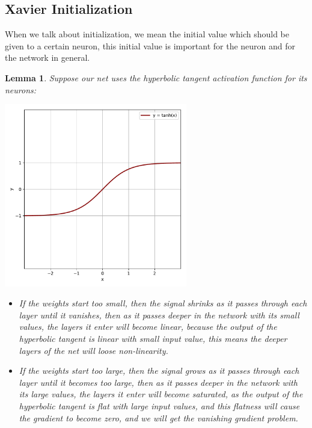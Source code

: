 \documentclass[12pt]{article}
\newtheorem{lemma}{Lemma}
\begin{document}
\subsection{\textbf{Xavier Initialization} \cite{DBLP:journals/jmlr/GlorotB10}}
When we talk about initialization, we mean the initial value which should be given to a certain neuron, this initial value is important for the neuron and for the network in general.\\
\begin{lemma}\label{lemma1}
Suppose our net uses the hyperbolic tangent activation function for its neurons:\\
\begin{center}
	\includegraphics[width=0.6\textwidth]{tanh}\\[1cm]
\end{center}
\begin{itemize}
	\item If the weights start too small, then the signal shrinks as it passes through each layer until it vanishes, then as it passes deeper in the network with its small values, the layers it enter will become linear, because the output of the hyperbolic tangent is linear with small input value, this means the deeper layers of the net will loose non-linearity.
	\item If the weights start too large, then the signal grows as it passes through each layer until it becomes too large, then as it passes deeper in the network with its large values, the layers it enter will become saturated, as the output of the hyperbolic tangent is flat with large input values, and this flatness will cause the gradient to become zero, and we will get the vanishing gradient problem.
\end{itemize}
\end{lemma}
\end{document}
